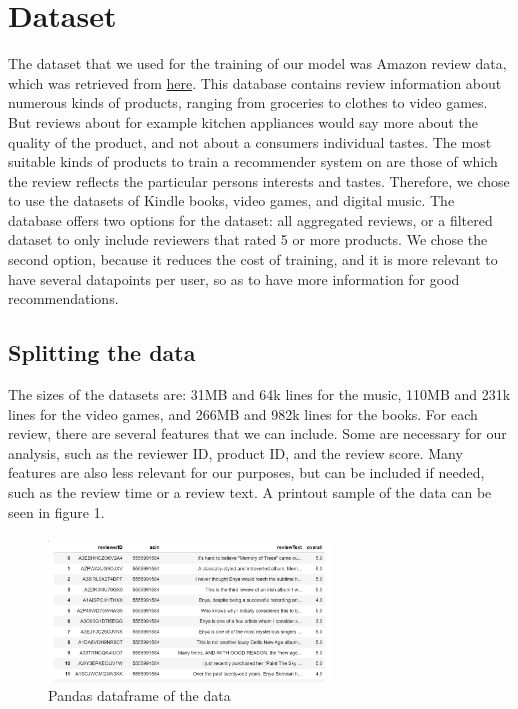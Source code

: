 \documentclass[11pt]{article}
\begin{document}
\section{Dataset}
The dataset that we used for the training of our model was Amazon review data, which was retrieved from \href{http://jmcauley.ucsd.edu/data/amazon/}{here}. This database contains review information about numerous kinds of products, ranging from groceries to clothes to video games. But reviews about for example kitchen appliances would say more about the quality of the product, and not about a consumers individual tastes. The most suitable kinds of products to train a recommender system on are those of which the review reflects the particular persons interests and tastes. Therefore, we chose to use the datasets of Kindle books, video games, and digital music. The database offers two options for the dataset: all aggregated reviews, or a filtered dataset to only include reviewers that rated 5 or more products. We chose the second option, because it reduces the cost of training, and it is more relevant to have several datapoints per user, so as to have more information for good recommendations. \\

\subsection{Splitting the data}
The sizes of the datasets are: 31MB and 64k lines for the music, 110MB and 231k lines for the video games, and 266MB and 982k lines for the books. For each review, there are several features that we can include. Some are necessary for our analysis, such as the reviewer ID, product ID, and the review score. Many features are also less relevant for our purposes, but can be included if needed, such as the review time or a review text. A printout sample of the data can be seen in figure 1. \\
\begin{figure}
    \includegraphics[width=7.5cm]{Pandas_df_example.png}
    \caption{Pandas dataframe of the data}
\end{figure}
\end{document}
